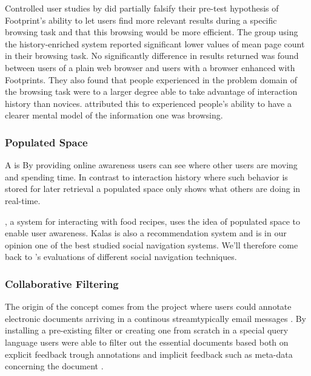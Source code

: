 Controlled user studies by \citeauthor{wexelblat99} did partially falsify
their pre-test hypothesis of Footprint's ability to let users find more
relevant results during a specific browsing task and that this browsing
would be more efficient. The group using the history-enriched system reported
significant lower values of mean page count in their browsing task. No
significantly difference in results returned was found between users of a
plain web browser and users with a browser enhanced with Footprints. They also
found that people experienced in the problem domain of the browsing task were
to a larger degree able to take advantage of interaction history than novices.
\citeauthor{wexelblat99} attributed this to experienced people's ability to
have a clearer mental model of the information one was browsing.


\subsubsection{Populated Space}

A  is
By providing online awareness users can see where other users are moving and
spending time. In contrast to interaction history where such behavior is
stored for later retrieval a populated space only shows what others are doing
in real-time.

 \citep{svensson05}, a system for interacting with food
recipes, uses the idea of populated space to enable user awareness. Kalas is
also a recommendation system and is in our opinion one of the best studied
social navigation systems. We'll therefore come back to
\citeauthor{svensson05}'s evaluations of different social
navigation techniques.

\subsubsection{Collaborative Filtering}
\label{section:background.social.navigation.applied.forms.collaborative.filtering}

 
The origin of the concept comes from the 
project where users could annotate electronic documents arriving in a
continous stream\dash{}typically email messages \citep[]{goldberg92}. By
installing a pre-existing filter or creating one from scratch in a
special query language users were able to filter out the essential documents
based both on explicit feedback trough annotations and implicit feedback such
as meta-data concerning the document \citep[]{goldberg92}.

